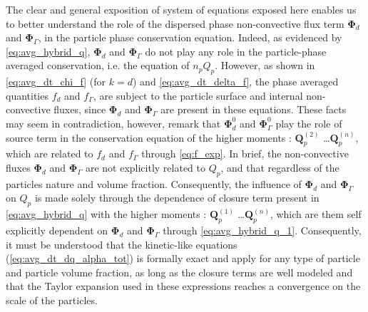 The clear and general exposition of system of equations exposed here enables us to better understand the role of the dispersed phase non-convective flux term $\bm\Phi_d$ and $\bm\Phi_\Gamma$, in the particle phase conservation equation. 
Indeed, as evidenced by \ref{eq:avg_hybrid_q}, $\bm{\Phi}_d$ and $\bm{\Phi}_\Gamma$ do not play any role in the particle-phase averaged conservation, i.e. the equation of $n_pQ_p$. 
However, as shown in \ref{eq:avg_dt_chi_f} (for $k = d$) and \ref{eq:avg_dt_delta_f}, the phase averaged quantities $f_d$ and $f_\Gamma$, are subject to the particle surface and internal non-convective fluxes, since $\bm{\Phi}_d$ and $\bm{\Phi}_\Gamma$ are present in these equations.
These facts may seem in contradiction, however, remark that $\bm{\Phi}_d^0$ and $\bm{\Phi}_\Gamma^0$ play the role of source term in the conservation equation of the higher moments : $\textbf{Q}^{(2)}_p$ \ldots $\textbf{Q}^{(n)}_p$, which are related to $f_d$ and $f_\Gamma$ through \ref{eq:f_exp}.
In brief, the non-convective fluxes $\bm{\Phi}_d$ and $\bm{\Phi}_\Gamma$  are not explicitly related to $Q_p$, and that regardless of the particles nature and volume fraction. 
Consequently, the influence of $\bm{\Phi}_d$ and $\bm{\Phi}_\Gamma$ on $Q_p$ is made solely through the dependence of closure term present in \ref{eq:avg_hybrid_q} with the higher moments : $\textbf{Q}^{(1)}_p$ \ldots $\textbf{Q}^{(n)}_p$, which are them self explicitly dependent on $\bm{\Phi}_d$ and $\bm{\Phi}_\Gamma$ through \ref{eq:avg_hybrid_q_1}. 
Consequently, it must be understood that the kinetic-like equations (\ref{eq:avg_dt_dq_alpha_tot}) is formally exact and apply for any type of particle and particle volume fraction, as long as the closure terms are well modeled and that the Taylor expansion used in these expressions reaches a convergence on the scale of the particles. 



